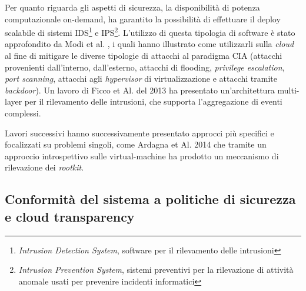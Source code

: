 \documentclass[../main.tex]{subfiles}
\begin{document}
Per quanto riguarda gli aspetti di sicurezza, la disponibilità di potenza computazionale on-demand, ha garantito la possibilità di effettuare il deploy scalabile di sistemi IDS\footnote{\textit{Intrusion Detection System}, software per il rilevamento delle intrusioni} e IPS\footnote{\textit{Intrusion Prevention System}, sistemi preventivi per la rilevazione di attività anomale usati per prevenire incidenti informatici}. 
L'utilizzo di questa tipologia di software è stato approfondito da Modi et al. \cite{7745295}, i quali hanno illustrato come utilizzarli sulla \textit{cloud} al fine di mitigare le diverse tipologie di attacchi al paradigma CIA (attacchi provenienti dall'interno, dall'esterno, attacchi di flooding, \textit{privilege escalation}, \textit{port scanning}, attacchi agli \textit{hypervisor} di virtualizzazione e attacchi tramite \textit{backdoor}). Un lavoro di Ficco et Al. del 2013 \cite{6681240} ha presentato un'architettura multi-layer per il rilevamento delle intrusioni, che supporta l'aggregazione di eventi complessi.

Lavori successivi hanno successivamente presentato approcci più specifici e focalizzati su problemi singoli, come Ardagna et Al. 2014 \cite{6814039} che tramite un approccio introspettivo sulle virtual-machine ha prodotto un meccanismo di rilevazione dei \textit{rootkit}.

\subsection{Conformità del sistema a politiche di sicurezza e cloud transparency}
\end{document}
